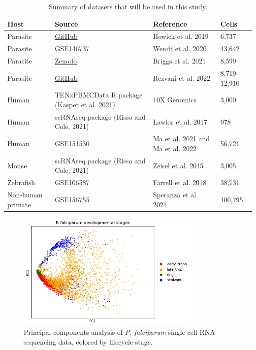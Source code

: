 \documentclass{article}
\begin{document}
\begin{table}[h]
  \caption{Summary of datasets that will be used in this study.}
  \label{tab:summary}
  \centering
  \begin{tabularx}{\textwidth}{lXll}
    \toprule
    \textbf{Host} & \textbf{Source} & \textbf{Reference} & \textbf{Cells} \\
    \midrule
    Parasite & \href{https://github.com/vhowick/MalariaCellAtlas/tree/master/Expression_Matrices10X/pf10xIDC}{GitHub} & Howick et al. 2019 & 6,737 \\
    \midrule
    Parasite & GSE146737 & Wendt et al. 2020 & 43,642 \\
    \midrule
    Parasite & \href{https://zenodo.org/record/5163554\#.YQvu2ZNKjUo}{Zenodo} & Briggs et al. 2021 & 8,599 \\
    \midrule
    Parasite & \href{https://github.com/umbibio/scBabesiaAtlases}{GitHub} & Rezvani et al. 2022 & 8,719-12,910 \\
    \midrule
    Human & TENxPBMCData R package (Kasper et al. 2021) & 10X Genomics & 3,000 \\
    \midrule
    Human & scRNAseq package (Risso and Cole, 2021) & Lawlor et al. 2017 & 978 \\
    \midrule
    Human & GSE151530 & Ma et al. 2021 and Ma et al. 2022 & 56,721 \\
    \midrule
    Mouse & scRNAseq package (Risso and Cole, 2021) & Zeisel et al. 2015 & 3,005 \\
    \midrule
    Zebrafish & GSE106587 & Farrell et al. 2018 & 38,731 \\
    \midrule
    Non-human primate & GSE156755 & Speranza et al. 2021 & 100,795 \\
    \bottomrule
  \end{tabularx}
\end{table}

\begin{figure}
  \centering
  \includegraphics[width=0.8\textwidth]{figures/pca_Pf.png}
  \caption{Principal components analysis of \textit{P. falciparum} single cell RNA sequencing data, colored by lifecycle stage.}
\end{figure}
\end{document}
